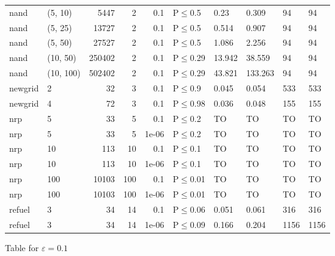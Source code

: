 \begin{longtable}{llrrrlllll}
 nand          & (5, 10)   &   	5447 &   2 & 0.1   & P$\leq$0.5   & 0.23    & 0.309   & 94     & 94     \\
 nand          & (5, 25)   &  	13727 &   2 & 0.1   & P$\leq$0.5   & 0.514   & 0.907   & 94     & 94     \\
 nand          & (5, 50)   &  	27527 &   2 & 0.1   & P$\leq$0.5   & 1.086   & 2.256   & 94     & 94     \\
 nand          & (10, 50)  & 	250402 &   2 & 0.1   & P$\leq$0.29  & 13.942  & 38.559  & 94     & 94     \\
 nand          & (10, 100) & 	502402 &   2 & 0.1   & P$\leq$0.29  & 43.821  & 133.263 & 94     & 94     \\
 newgrid       & 2         &     	32 &   3 & 0.1   & P$\leq$0.9   & 0.045   & 0.054   & 533    & 533    \\
 newgrid       & 4         &     	72 &   3 & 0.1   & P$\leq$0.98  & 0.036   & 0.048   & 155    & 155    \\
 nrp           & 5         &     	33 &   5 & 0.1   & P$\leq$0.2   & TO      & TO      & TO     & TO     \\
 nrp           & 5         &     	33 &   5 & 1e-06 & P$\leq$0.2   & TO      & TO      & TO     & TO     \\
 nrp           & 10        &    	113 &  10 & 0.1   & P$\leq$0.1   & TO      & TO      & TO     & TO     \\
 nrp           & 10        &    	113 &  10 & 1e-06 & P$\leq$0.1   & TO      & TO      & TO     & TO     \\
 nrp           & 100       &  	10103 & 100 & 0.1   & P$\leq$0.01  & TO      & TO      & TO     & TO     \\
 nrp           & 100       &  	10103 & 100 & 1e-06 & P$\leq$0.01  & TO      & TO      & TO     & TO     \\
 refuel        & 3         &     	34 &  14 & 0.1   & P$\leq$0.06  & 0.051   & 0.061   & 316    & 316    \\
 refuel        & 3         &     	34 &  14 & 1e-06 & P$\leq$0.09  & 0.166   & 0.204   & 1156   & 1156   \\
\bottomrule
\end{longtable}
\small Table for \(\varepsilon=0.1\)
